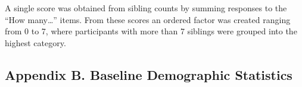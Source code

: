 \documentclass[
  single column]{article}
\begin{document}
A single score was obtained from sibling counts by summing responses to
the ``How many\ldots{}'' items. From these scores an ordered factor was
created ranging from 0 to 7, where participants with more than 7
siblings were grouped into the highest category.

\newpage{}

\subsection{Appendix B. Baseline Demographic
Statistics}\label{appendix-demographics}

\begin{table}

\caption{\label{tbl-B}}

\centering{

\captionsetup{labelsep=none}

}

\end{table}%
\end{document}
